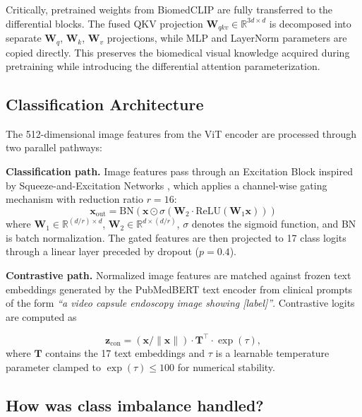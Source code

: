 \documentclass[12pt]{article}
\begin{document}
Critically, pretrained weights from BiomedCLIP are fully transferred to the differential blocks. The fused QKV projection $\mathbf{W}_{qkv} \in \mathbb{R}^{3d \times d}$ is decomposed into separate $\mathbf{W}_q$, $\mathbf{W}_k$, $\mathbf{W}_v$ projections, while MLP and LayerNorm parameters are copied directly. This preserves the biomedical visual knowledge acquired during pretraining while introducing the differential attention parameterization.

\subsection{Classification Architecture}

The 512-dimensional image features from the ViT encoder are processed through two parallel pathways:

\textbf{Classification path.} Image features pass through an Excitation Block inspired by Squeeze-and-Excitation Networks \cite{Hu2018senet}, which applies a channel-wise gating mechanism with reduction ratio $r=16$:
\begin{equation}
    \mathbf{x}_{\text{out}} = \text{BN}\left(\mathbf{x} \odot \sigma\left(\mathbf{W}_2 \cdot \text{ReLU}\left(\mathbf{W}_1 \mathbf{x}\right)\right)\right)
\end{equation}
where $\mathbf{W}_1 \in \mathbb{R}^{(d/r) \times d}$, $\mathbf{W}_2 \in \mathbb{R}^{d \times (d/r)}$, $\sigma$ denotes the sigmoid function, and BN is batch normalization. The gated features are then projected to 17 class logits through a linear layer preceded by dropout ($p=0.4$).

\textbf{Contrastive path.} Normalized image features are matched against frozen text embeddings generated by the PubMedBERT text encoder from clinical prompts of the form \textit{``a video capsule endoscopy image showing [label]''}. Contrastive logits are computed as 

\begin{equation}
    \mathbf{z}_{\text{con}} = (\mathbf{x} / \|\mathbf{x}\|) \cdot \mathbf{T}^\top \cdot \exp(\tau),
\end{equation}where $\mathbf{T}$ contains the 17 text embeddings and $\tau$ is a learnable temperature parameter clamped to $\exp(\tau) \leq 100$ for numerical stability.

\subsection{How was class imbalance handled?}
\end{document}
